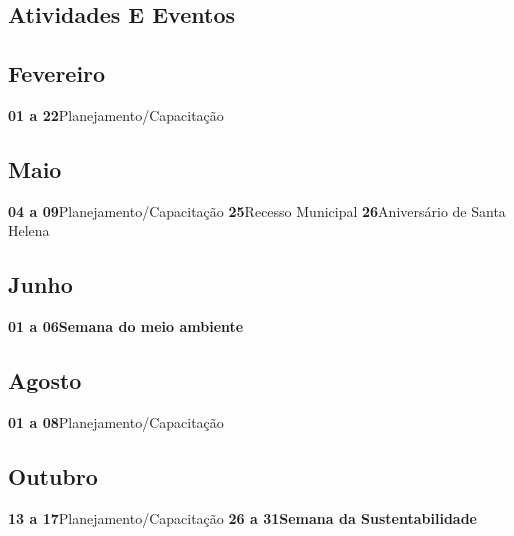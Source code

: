 \documentclass[thesis]{hmcposter}
\begin{document}
\begin{poster}
\normalsize \section{\color{hmcorange}Atividades E Eventos}\subsection{Fevereiro}\textbf{01 a 22}\quad \quad Planejamento/Capacitação \newline\subsection{Maio}\textbf{04 a 09}\quad \quad Planejamento/Capacitação \newline\textbf{25}\quad \quad \quad \quad Recesso Municipal \newline\textbf{26}\quad \quad \quad \quad Aniversário de Santa Helena \newline\subsection{Junho}\textbf{01 a 06}\quad \quad \textbf{Semana do meio ambiente} \newline\subsection{Agosto}\textbf{01 a 08}\quad \quad Planejamento/Capacitação \newline\subsection{Outubro}\textbf{13 a 17}\quad \quad Planejamento/Capacitação \newline\textbf{26 a 31}\quad \quad \textbf{Semana da Sustentabilidade} \newline\end{poster}
\end{document}
